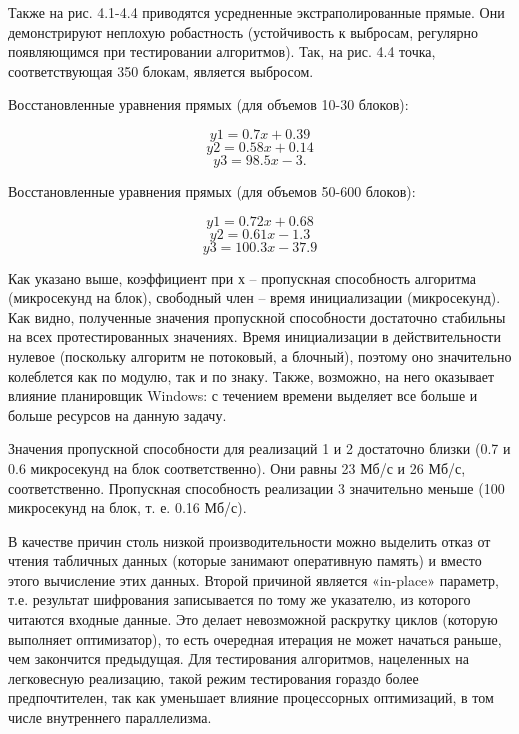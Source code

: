 Также на рис. 4.1-4.4 приводятся усредненные экстраполированные прямые. Они демонстрируют неплохую робастность (устойчивость к выбросам, регулярно появляющимся при тестировании алгоритмов). Так, на рис. 4.4 точка, соответствующая 350 блокам, является выбросом.

Восстановленные уравнения прямых (для объемов 10-30 блоков):

\begin{equation}
y1 = 0.7x + 0.39
\end{equation}
\begin{equation}
y2 = 0.58x + 0.14
\end{equation}
\begin{equation}
y3 = 98.5x - 3.
\end{equation}

Восстановленные уравнения прямых (для объемов 50-600 блоков):

\begin{equation}
y1 = 0.72x + 0.68
\end{equation}
\begin{equation}
y2 = 0.61x - 1.3
\end{equation}
\begin{equation}
y3 = 100.3x - 37.9
\end{equation}

Как указано выше, коэффициент при х – пропускная способность алгоритма (микросекунд на блок), свободный член – время инициализации (микросекунд). Как видно, полученные значения пропускной способности достаточно стабильны на всех протестированных значениях. Время инициализации в действительности нулевое (поскольку алгоритм не потоковый, а блочный), поэтому оно значительно колеблется как по модулю, так и по знаку. Также, возможно, на него оказывает влияние планировщик Windows: с течением времени выделяет все больше и больше ресурсов на данную задачу.

Значения пропускной способности для реализаций 1 и 2 достаточно близки (0.7 и 0.6 микросекунд на блок соответственно). Они равны 23 Мб/с и 26 Мб/с, соответственно. Пропускная способность реализации 3 значительно меньше (100 микросекунд на блок, т. е. 0.16 Мб/с).

В качестве причин столь низкой производительности можно выделить отказ от чтения табличных данных (которые занимают оперативную память) и вместо этого вычисление этих данных. Второй причиной является «in-place» параметр, т.е. результат шифрования записывается по тому же указателю, из которого читаются входные данные. Это делает невозможной раскрутку циклов (которую выполняет оптимизатор), то есть очередная итерация не может начаться раньше, чем закончится предыдущая. Для тестирования алгоритмов, нацеленных на легковесную реализацию, такой режим тестирования гораздо более предпочтителен, так как уменьшает влияние процессорных оптимизаций, в том числе внутреннего параллелизма.

